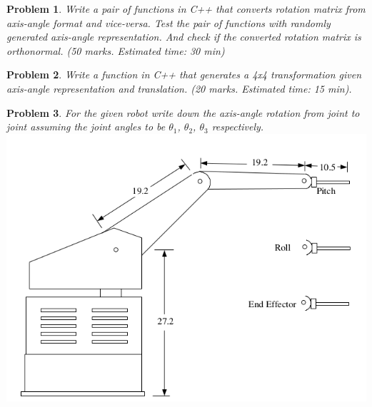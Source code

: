 \documentclass[twocolumn]{article}
\newtheorem{prob}{Problem}
\begin{document}
\begin{prob}
  Write a pair of functions in C++ that converts rotation
  matrix from axis-angle format and vice-versa. Test the pair of functions with randomly
  generated axis-angle representation. And check if the converted rotation
  matrix  is orthonormal. (50 marks. Estimated time: 30 min)
\end{prob}

\begin{prob}
  Write a function in C++ that generates a 4x4 transformation given axis-angle
  representation and translation. (20 marks. Estimated time: 15 min).
\end{prob}

\begin{prob}
  For the given robot write down the axis-angle rotation from joint to joint
  assuming the joint angles to be  $\theta_1$, $\theta_2$, $\theta_3$ respectively.
  \\
  \includegraphics[width=\linewidth]{robot.png}
  \\
\end{prob}
\end{document}
